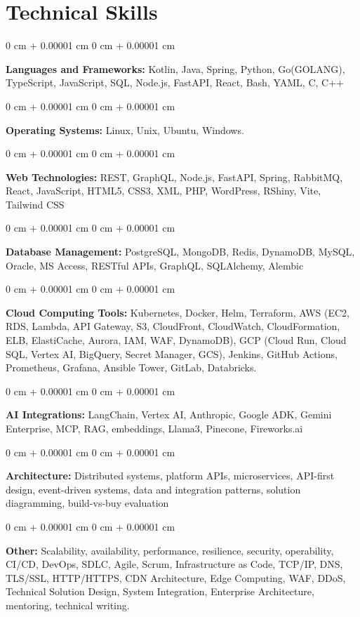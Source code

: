 \documentclass[10pt, letterpaper]{article}
\newenvironment{onecolentry}{
    \begin{adjustwidth}{
        0 cm + 0.00001 cm
    }{
        0 cm + 0.00001 cm
    }
}{
    \end{adjustwidth}
} %
\begin{document}
    \section{Technical Skills}
    \vspace{2 pt }
    \begin{onecolentry}
    \textbf{Languages and Frameworks:} Kotlin, Java, Spring, Python, Go(GOLANG), TypeScript, JavaScript, SQL, Node.js, FastAPI, React, Bash, YAML, C, C++
    \end{onecolentry}
    \begin{onecolentry}
        \textbf{Operating Systems:} Linux, Unix, Ubuntu, Windows.
    \end{onecolentry}
    \begin{onecolentry}
         \textbf{Web Technologies:} REST, GraphQL, Node.js, FastAPI, Spring, RabbitMQ, React, JavaScript, HTML5, CSS3, XML, PHP, WordPress, RShiny, Vite, Tailwind CSS
    \end{onecolentry}
    \begin{onecolentry}
        \textbf{Database Management:} PostgreSQL, MongoDB, Redis, DynamoDB, MySQL, Oracle, MS Access, RESTful APIs, GraphQL, SQLAlchemy, Alembic
    \end{onecolentry}
    \begin{onecolentry}
        \textbf{Cloud Computing Tools:}
Kubernetes, Docker, Helm, Terraform, AWS (EC2, RDS, Lambda, API Gateway, S3, CloudFront, CloudWatch, CloudFormation, ELB, ElastiCache, Aurora, IAM, WAF, DynamoDB), GCP (Cloud Run, Cloud SQL, Vertex AI, BigQuery, Secret Manager, GCS), Jenkins, GitHub Actions, Prometheus, Grafana, Ansible Tower, GitLab, Databricks.
    \end{onecolentry}
    \begin{onecolentry}
         \textbf{AI Integrations:} LangChain, Vertex AI, Anthropic, Google ADK, Gemini Enterprise, MCP, RAG, embeddings, Llama3, Pinecone, Fireworks.ai
    \end{onecolentry}
    \begin{onecolentry}
        \textbf{Architecture:} Distributed systems, platform APIs, microservices, API-first design, event-driven systems, data and integration patterns, solution diagramming, build-vs-buy evaluation
    \end{onecolentry}
        \begin{onecolentry}
     \textbf{Other:} Scalability, availability, performance, resilience, security, operability, CI/CD, DevOps, SDLC, Agile, Scrum, Infrastructure as Code, TCP/IP, DNS, TLS/SSL, HTTP/HTTPS, CDN Architecture, Edge Computing, WAF, DDoS, Technical Solution Design, System Integration, Enterprise Architecture, mentoring, technical writing.
    \end{onecolentry}
\end{document}
